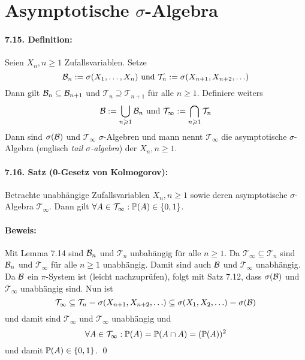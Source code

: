 \section*{Asymptotische $\sigma$-Algebra}

\paragraph{7.15. Definition:}Seien $X_n,n\geq1$ Zufallsvariablen. Setze 
$$\mathcal{B}_n:=\sigma(X_1,\hdots,X_n)\text{ und }\mathcal{T}_n:=\sigma(X_{n+1},X_{n+2},\hdots)$$
Dann gilt $\mathcal{B}_n\subseteq\mathcal{B}_{n+1}$ und $\mathcal{T}_n\supseteq\mathcal{T}_{n+1}$ f\"ur alle $n\geq1$. Definiere weiters
$$\mathcal{B}:=\bigcup_{n\geqslant1}\mathcal{B}_n\text{ und }\mathcal{T}_\infty:=\bigcap_{n\geqslant1}\mathcal{T}_n$$
Dann sind $\sigma(\mathcal{B})$ und $\mathcal{T}_\infty$ $\sigma$-Algebren und mann nennt $\mathcal{T}_\infty$ die asymptotische $\sigma$-Algebra (englisch \textit{tail $\sigma$-algebra}) der $X_n,n\geq1$. 

\paragraph{7.16. Satz (0-Gesetz von Kolmogorov):}Betrachte unabh\"angige Zufallsvariablen $X_n,n\geq1$ sowie deren asymptotische $\sigma$-Algebra $\mathcal{T}_\infty$. Dann gilt $\forall A\in\mathcal{T}_\infty:\mathbb{P}(A)\in\{0,1\}$.

\paragraph{Beweis:}Mit Lemma 7.14 sind $\mathcal{B}_n$ und $\mathcal{T}_n$ unbah\"angig f\"ur alle $n\geq1$. Da $\mathcal{T}_\infty\subseteq\mathcal{T}_n$ sind $\mathcal{B}_n$ und $\mathcal{T}_\infty$ f\"ur alle $n\geq1$ unabh\"angig. Damit sind auch $\mathcal{B}$ und $\mathcal{T}_\infty$ unabh\"angig. Da $\mathcal{B}$ ein $\pi$-System ist (leicht nachzupr\"ufen), folgt mit Satz 7.12, dass $\sigma(\mathcal{B})$ und $\mathcal{T}_\infty$ unabh\"angig sind. Nun ist
$$\mathcal{T}_\infty\subseteq\mathcal{T}_n=\sigma(X_{n+1},X_{n+2},\hdots)\subseteq\sigma(X_1,X_2,\hdots)=\sigma(\mathcal{B})$$
und damit sind $\mathcal{T}_\infty$ und $\mathcal{T}_\infty$ unabh\"angig und 
$$\forall A\in\mathcal{T}_\infty:\mathbb{P}(A)=\mathbb{P}(A\cap A)=(\mathbb{P}(A))^2$$
und damit $\mathbb{P}(A)\in\{0,1\}$. \qed

